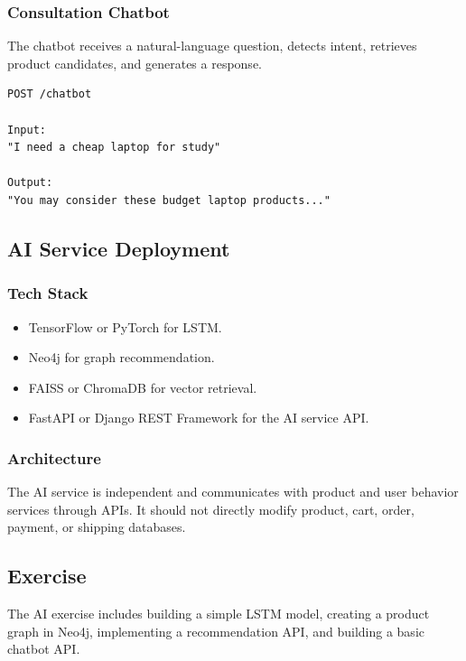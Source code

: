 \documentclass[12pt,a4paper]{article}
\begin{document}
\subsubsection{Consultation Chatbot}

The chatbot receives a natural-language question, detects intent, retrieves product candidates, and generates a response.

\begin{lstlisting}[caption={Chatbot API.}]
POST /chatbot

Input:
"I need a cheap laptop for study"

Output:
"You may consider these budget laptop products..."
\end{lstlisting}

\subsection{AI Service Deployment}

\subsubsection{Tech Stack}

\begin{itemize}
    \item TensorFlow or PyTorch for LSTM.
    \item Neo4j for graph recommendation.
    \item FAISS or ChromaDB for vector retrieval.
    \item FastAPI or Django REST Framework for the AI service API.
\end{itemize}

\subsubsection{Architecture}

The AI service is independent and communicates with product and user behavior services through APIs. It should not directly modify product, cart, order, payment, or shipping databases.

\subsection{Exercise}

The AI exercise includes building a simple LSTM model, creating a product graph in Neo4j, implementing a recommendation API, and building a basic chatbot API.
\end{document}
